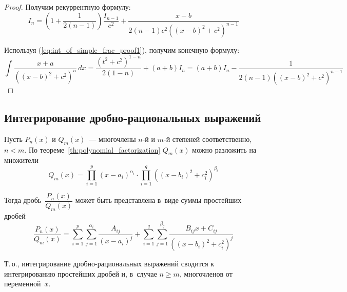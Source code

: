 \begin{itemize}
\begin{proof}
	Получим рекуррентную формулу:
	\begin{equation*}
	I_n = \left( 1 + \frac1{2(n - 1)} \right) \frac{I_{n-1}}{c^2} + \frac{x - b}{2(n - 1)c^2 ((x - b)^2 + c^2)^{n-1}}
	\end{equation*}
	
	Используя (\ref{eq:int_of_simple_frac_proof1}), получим конечную формулу:
	\begin{equation*}
	\int \frac{x + a}{((x - b)^2 + c^2)^n}\,dx =
	\frac{(t^2 + c^2)^{1-n}}{2(1 - n)} + (a + b)I_n =
	(a + b)I_n - \frac1{2(n - 1)((x - b)^2 + c^2)^{n-1}}
	\end{equation*}
	\end{proof}
\end{itemize}

\subsection{Интегрирование дробно-рациональных выражений}
Пусть $P_n(x)$ и $Q_m(x)$~--- многочлены $n$-й и $m$-й степеней соответственно, $n < m$.
По теореме~\ref{th:polynomial_factorization} $Q_m(x)$ можно разложить на множители
\begin{equation*}
Q_m(x) = \prod_{i=1}^{p} (x - a_i)^{\alpha_i} \cdot \prod_{i=1}^{q} ((x - b_i)^2 + c_i^2)^{\beta_i}
\end{equation*}

Тогда дробь~$\dfrac{P_n(x)}{Q_m(x)}$ может быть представлена в~виде суммы простейших дробей
\begin{equation*}
\frac{P_n(x)}{Q_m(x)} = \sum_{i=1}^p \sum_{j=1}^{\alpha_i} \frac{A_{ij}}{(x - a_i)^j} + \sum_{i=1}^q \sum_{j=1}^{\beta_q} \frac{B_{ij}x + C_{ij}}{((x - b_i)^2 + c_i^2)^j}
\end{equation*}

Т.\,о., интегрирование дробно-рациональных выражений сводится к интегрированию простейших дробей и, в~случае $n \geqslant m$, многочленов от переменной~$x$.

